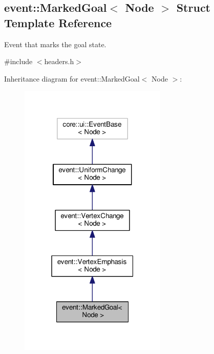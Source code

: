 \hypertarget{structevent_1_1MarkedGoal}{}\subsection{event\+:\+:Marked\+Goal$<$ Node $>$ Struct Template Reference}
\label{structevent_1_1MarkedGoal}


Event that marks the goal state.  




{\ttfamily \#include $<$headers.\+h$>$}



Inheritance diagram for event\+:\+:Marked\+Goal$<$ Node $>$\+:\nopagebreak
\begin{figure}[H]
\begin{center}
\leavevmode
\includegraphics[width=199pt]{structevent_1_1MarkedGoal__inherit__graph}
\end{center}
\end{figure}


